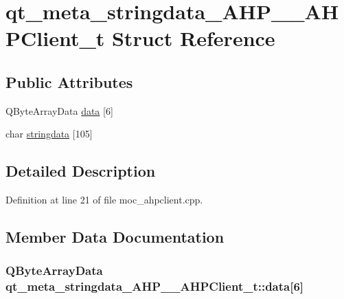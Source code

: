 \hypertarget{structqt__meta__stringdata___a_h_p_____a_h_p_client__t}{}\section{qt\+\_\+meta\+\_\+stringdata\+\_\+\+A\+H\+P\+\_\+\+\_\+\+A\+H\+P\+Client\+\_\+t Struct Reference}
\label{structqt__meta__stringdata___a_h_p_____a_h_p_client__t}
\subsection*{Public Attributes}
\begin{DoxyCompactItemize}
\item 
Q\+Byte\+Array\+Data \hyperlink{structqt__meta__stringdata___a_h_p_____a_h_p_client__t_a556a9bc9993a1ffda48043e0473c820a}{data} \mbox{[}6\mbox{]}
\item 
char \hyperlink{structqt__meta__stringdata___a_h_p_____a_h_p_client__t_aa3cc0abc0beb5400fad54b1b3d149473}{stringdata} \mbox{[}105\mbox{]}
\end{DoxyCompactItemize}


\subsection{Detailed Description}


Definition at line 21 of file moc\+\_\+ahpclient.\+cpp.



\subsection{Member Data Documentation}
\hypertarget{structqt__meta__stringdata___a_h_p_____a_h_p_client__t_a556a9bc9993a1ffda48043e0473c820a}{}
\subsubsection[{data}]{\setlength{\rightskip}{0pt plus 5cm}Q\+Byte\+Array\+Data qt\+\_\+meta\+\_\+stringdata\+\_\+\+A\+H\+P\+\_\+\+\_\+\+A\+H\+P\+Client\+\_\+t\+::data\mbox{[}6\mbox{]}}\label{structqt__meta__stringdata___a_h_p_____a_h_p_client__t_a556a9bc9993a1ffda48043e0473c820a}


